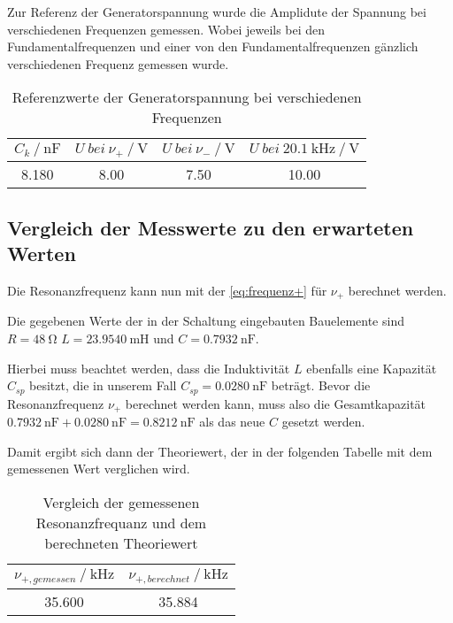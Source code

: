 Zur Referenz der Generatorspannung wurde die Amplidute der Spannung bei verschiedenen Frequenzen gemessen. Wobei jeweils bei den Fundamentalfrequenzen und einer von den Fundamentalfrequenzen gänzlich verschiedenen Frequenz gemessen wurde.

\begin{table}
  \centering
  \caption{Referenzwerte der Generatorspannung bei verschiedenen Frequenzen}
  \label{tab:resonanz}
  \begin{tabular}{c c c c}
    \toprule 
    $C_k \:/\: \si{\nano\farad}$ & $U \: bei\:  \nu _+ \:/\: \si{\volt}$ & $U \: bei \: \nu _- \:/\: \si{\volt}$ & $U \: bei \: \SI{20.1}{\kilo\hertz} \:/\: \si{\volt} $ \\ 
    \midrule 
     8.180 & 8.00 & 7.50 & 10.00 \\
    \bottomrule
  \end{tabular}
\end{table}

\subsection{Vergleich der Messwerte zu den erwarteten Werten}
\label{sec:vergleich}

Die Resonanzfrequenz kann nun mit der \autoref{eq:frequenz+} für $\nu _+$ berechnet werden.

Die gegebenen Werte der in der Schaltung eingebauten Bauelemente sind $R = \SI{48}{\ohm}$ $L = \SI{23.9540}{\milli\henry}$ und $C = \SI{0.7932}{\nano\farad}$.

Hierbei muss beachtet werden, dass die Induktivität $L$ ebenfalls eine Kapazität $C_{sp}$ besitzt, die in unserem Fall $C_{sp} = \SI{0.0280}{\nano\farad}$ beträgt.
Bevor die Resonanzfrequenz $\nu _+$ berechnet werden kann, muss also die Gesamtkapazität $\SI{0.7932}{\nano\farad} + \SI{0.0280}{\nano\farad} = \SI{0.8212}{\nano\farad}$ als das neue $C$ gesetzt werden.

Damit ergibt sich dann der Theoriewert, der in der folgenden Tabelle mit dem gemessenen Wert verglichen wird.

\begin{table}
  \centering
  \caption{Vergleich der gemessenen Resonanzfrequanz und dem berechneten Theoriewert}
  \label{tab:resonanz}
  \begin{tabular}{c c}
    \toprule 
    $\nu _{+,gemessen} \:/\: \si{\kilo\hertz}$ & $\nu _{+,berechnet} \:/\: \si{\kilo\hertz}$    \\ 
    \midrule 
    35.600 & 35.884 \\
    \bottomrule
  \end{tabular}
\end{table}

